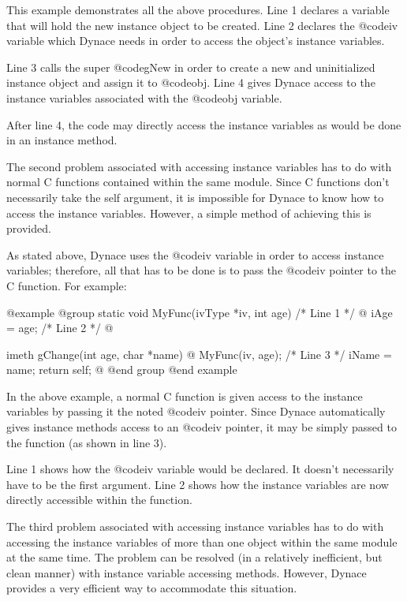 This example demonstrates all the above procedures.  Line 1 declares a
variable that will hold the new instance object to be created.  Line 2
declares the @code{iv} variable which Dynace needs in order to access
the object's instance variables.

Line 3 calls the super @code{gNew} in order to create a new and
uninitialized instance object and assign it to @code{obj}.  Line 4
gives Dynace access to the instance variables associated with the
@code{obj} variable.

After line 4, the code may directly access the instance variables
as would be done in an instance method.

The second problem associated with accessing instance variables has
to do with normal C functions contained within the same module.
Since C functions don't necessarily take the self argument, it is
impossible for Dynace to know how to access the instance variables.
However, a simple method of achieving this is provided.

As stated above, Dynace uses the @code{iv} variable in order to
access instance variables; therefore, all that has to be done is
to pass the @code{iv} pointer to the C function.  For example:

@example
@group
static  void    MyFunc(ivType *iv, int age)     /*  Line 1  */
@{
        iAge = age;                             /*  Line 2  */
@}

imeth   gChange(int age, char *name)
@{
        MyFunc(iv, age);                        /*  Line 3  */
        iName = name;
        return self;
@}
@end group
@end example

In the above example, a normal C function is given access to the
instance variables by passing it the noted @code{iv} pointer.
Since Dynace automatically gives instance methods access to an
@code{iv} pointer, it may be simply passed to the function
(as shown in line 3).

Line 1 shows how the @code{iv} variable would be declared.  It doesn't
necessarily have to be the first argument.  Line 2 shows how the
instance variables are now directly accessible within the function.

The third problem associated with accessing instance variables has to do
with accessing the instance variables of more than one object within the
same module at the same time.  The problem can be resolved (in a relatively
inefficient, but clean manner) with instance variable accessing methods.
However, Dynace provides a very efficient way to accommodate this situation.

